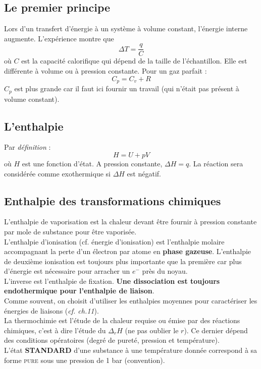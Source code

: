 \documentclass[british,french,11pt, a4paper, openany]{book}
\begin{document}
\subsection{Le premier principe}
Lors d'un transfert d'énergie à un système à volume constant, l'énergie interne augmente. L'expérience montre que 
$$\Delta T = \frac{q}{C}$$
où $C$ est la capacité calorifique qui dépend de la taille de l'échantillon. Elle est différente à volume ou à pression constante. Pour un gaz parfait :
$$C_p = C_v + R$$
$C_p$ est plus grande car il faut ici fournir un travail (qui n'était pas présent à volume constant).


\subsection{L'enthalpie}
Par \textit{définition} : 
$$H = U + pV$$
où $H$ est une fonction d'état. A pression constante, $\Delta H = q$. La réaction sera considérée comme exothermique si $\Delta H$ est négatif.

\subsection{Enthalpie des transformations chimiques}
L'enthalpie de vaporisation est la chaleur devant être fournir à pression constante par mole de substance pour être vaporisée.\\

L'enthalpie d'ionisation (cf. énergie d'ionisation) est l'enthalpie molaire accompagnant la perte d'un électron par atome en \textbf{phase gazeuse}. L'enthalpie de deuxième ionisation est toujours plus importante que la première car plus d'énergie est nécessaire pour arracher un $e^-$ près du noyau.\\
L'inverse est l'enthalpie de fixation. \textbf{Une dissociation est toujours endothermique pour l'enthalpie de liaison}.\\

Comme souvent, on choisit d'utiliser les enthalpies moyennes pour caractériser les énergies de liaisons (\textit{cf. ch.11}).\\

La thermochimie est l'étude de la chaleur requise ou émise par des réactions chimiques, c'est à dire l'étude du $\Delta_r H$ (ne pas oublier le $r$). Ce dernier dépend des conditions opératoires (degré de pureté, pression et température).\\
L'état \textbf{STANDARD} d'une substance à une température donnée correspond à sa forme \textsc{pure} sous une pression de 1 bar (convention).\\
\end{document}
